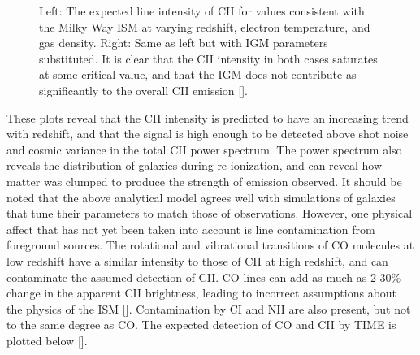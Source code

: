 \documentclass[manuscript]{aastex}
\begin{document}
\begin{figure}[!ht]%
    \centering
    \qquad
    \singlespace
    \caption[Calculated line intensities for CII in the ISM and IGM. -(\cite{Gong2012})]{Left: The expected line intensity of CII for values consistent with the Milky Way ISM at varying redshift, electron temperature, and gas density. Right: Same as left but with IGM parameters substituted. It is clear that the CII intensity in both cases saturates at some critical value, and that the IGM does not contribute as significantly to the overall CII emission [\cite{Gong2012}].}%
    \label{fig:example}%
\end{figure}

These plots reveal that the CII intensity is predicted to have an increasing trend with redshift, and that the signal is high enough to be detected above shot noise and cosmic variance in the total CII power spectrum. The power spectrum also reveals the distribution of galaxies during re-ionization, and can reveal how matter was clumped to produce the strength of emission observed. It should be noted that the above analytical model agrees well with simulations of galaxies that tune their parameters to match those of observations. However, one physical affect that has not yet been taken into account is line contamination from foreground sources. The rotational and vibrational transitions of CO molecules at low redshift have a similar intensity to those of CII at high redshift, and can contaminate the assumed detection of CII. CO lines  can add as much as 2-30\% change in the apparent CII brightness, leading to incorrect assumptions about the physics of the ISM [\cite{Gong2012}]. Contamination by CI and NII are also present, but not to the same degree as CO. The expected detection of CO and CII by TIME is plotted below [\cite{Crites2014}].
\end{document}
